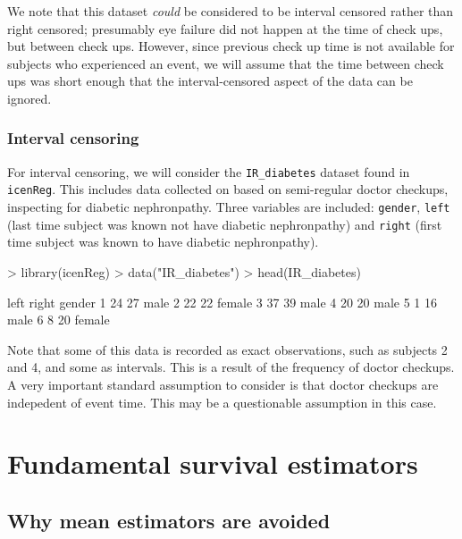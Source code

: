 \documentclass[a4paper]{article}
\begin{document}
   We note that this dataset \emph{could} be considered to be interval censored rather than right censored; presumably eye failure did not happen at the time of check ups, but between check ups. However, since previous check up time is not available for subjects who experienced an event, we will assume that the time between check ups was short enough that the interval-censored aspect of the data can be ignored. 

    \subsubsection{Interval censoring}

    For interval censoring, we will consider the \texttt{IR\_diabetes} dataset found in \texttt{icenReg}. This includes data collected on based on semi-regular doctor checkups, inspecting for diabetic nephronpathy. Three variables are included: \texttt{gender}, \texttt{left} (last time subject was known not have diabetic nephronpathy) and \texttt{right} (first time subject was known to have diabetic nephronpathy). 
    
\begin{Schunk}
\begin{Sinput}
> library(icenReg)
> data("IR_diabetes")
> head(IR_diabetes)
\end{Sinput}
\begin{Soutput}
  left right gender
1   24    27   male
2   22    22 female
3   37    39   male
4   20    20   male
5    1    16   male
6    8    20 female
\end{Soutput}
\end{Schunk}

Note that some of this data is recorded as exact observations, such as subjects 2 and 4, and some as intervals. This is a result of the frequency of doctor checkups. A very important standard assumption to consider is that doctor checkups are indepedent of event time. This may be a questionable assumption in this case. 


\section{Fundamental survival estimators}
  
  \subsection{Why mean estimators are avoided}
  
\end{document}
